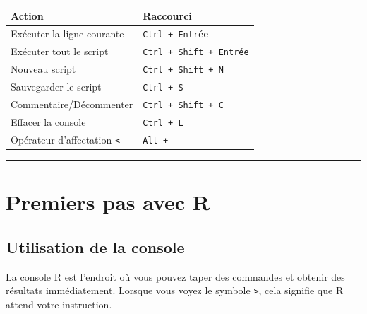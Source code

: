 \documentclass[
  french,
  11pt,
  a4paper,
]{article}
\newcounter{none} %
\begin{document}
\begin{tcolorbox}[enhanced jigsaw, arc=.35mm, bottomrule=.15mm, bottomtitle=1mm, breakable, colback=white, colbacktitle=quarto-callout-important-color!10!white, colframe=quarto-callout-important-color-frame, coltitle=black, left=2mm, leftrule=.75mm, opacityback=0, opacitybacktitle=0.6, rightrule=.15mm, title=\textcolor{quarto-callout-important-color}{\faExclamation}\hspace{0.5em}{À retenir --- Les raccourcis essentiels de RStudio}, titlerule=0mm, toprule=.15mm, toptitle=1mm]

{\def\LTcaptype{none} %
\begin{longtable}[]{@{}ll@{}}
\toprule\noalign{}
Action & Raccourci \\
\midrule\noalign{}
\endhead
\bottomrule\noalign{}
\endlastfoot
Exécuter la ligne courante & \texttt{Ctrl\ +\ Entrée} \\
Exécuter tout le script & \texttt{Ctrl\ +\ Shift\ +\ Entrée} \\
Nouveau script & \texttt{Ctrl\ +\ Shift\ +\ N} \\
Sauvegarder le script & \texttt{Ctrl\ +\ S} \\
Commentaire/Décommenter & \texttt{Ctrl\ +\ Shift\ +\ C} \\
Effacer la console & \texttt{Ctrl\ +\ L} \\
Opérateur d'affectation \texttt{\textless{}-} & \texttt{Alt\ +\ -} \\
\end{longtable}
}

\end{tcolorbox}

\begin{center}\rule{0.5\linewidth}{0.5pt}\end{center}

\section{Premiers pas avec R}\label{premiers-pas-avec-r}

\subsection{Utilisation de la console}\label{utilisation-de-la-console}

La console R est l'endroit où vous pouvez taper des commandes et obtenir
des résultats immédiatement. Lorsque vous voyez le symbole
\texttt{\textgreater{}}, cela signifie que R attend votre instruction.
\end{document}

